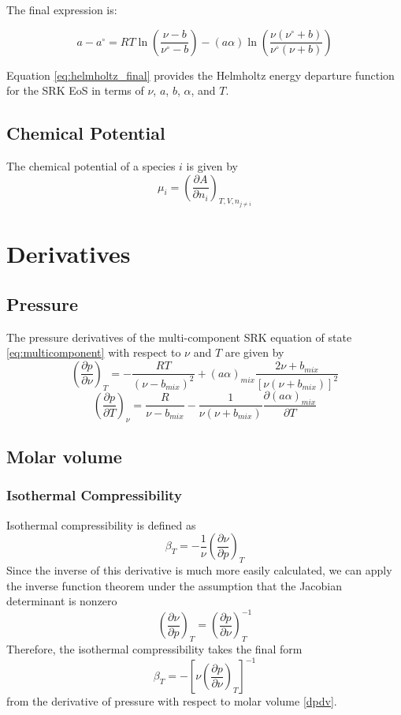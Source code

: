 \documentclass{article}
\newcommand{\pderiv}[2]{\frac{\partial #1}{\partial #2}}
\newcommand{\pderivconst}[3]{\left(\pderiv{#1}{#2}\right)_{#3}}
\begin{document}
The final expression is:

\begin{equation}
a - a^\circ = RT \ln\left(\frac{\nu - b}{\nu^\circ - b}\right) - (a\alpha) \ln\left(\frac{\nu(\nu^\circ + b)}{\nu^\circ(\nu + b)}\right) \label{eq:helmholtz_final}
\end{equation}

Equation \eqref{eq:helmholtz_final} provides the Helmholtz energy departure function for the SRK EoS in terms of \( \nu \), \( a \), \( b \), \( \alpha \), and \( T \).

\subsection{Chemical Potential}
The chemical potential of a species $i$ is given by
\begin{equation}
    \mu_i = \pderivconst{A}{n_i}{T,V,n_{j\neq i}}
\end{equation}

\section{Derivatives}
\subsection{Pressure}
The pressure derivatives of the multi-component SRK equation of state \eqref{eq:multicomponent} with respect to $\nu$ and $T$ are given by
\begin{equation}
    \pderivconst{p}{\nu}{T} = -\frac{RT}{(\nu-b_{mix})^2} + (a\alpha)_{mix}\frac{2\nu+b_{mix}}{[\nu(\nu+b_{mix})]^2} \label{dpdv}
\end{equation}
\begin{equation}
    \pderivconst{p}{T}{\nu} = \frac{R}{\nu-b_{mix}} - \frac{1}{\nu(\nu+b_{mix})}\frac{\partial (a\alpha)_{mix}}{\partial T} \label{dpdT}
\end{equation}


\subsection{Molar volume}
\subsubsection{Isothermal Compressibility}
Isothermal compressibility is defined as 
\begin{equation}
    \beta_T = -\frac{1}{\nu} \pderivconst{\nu}{p}{T}
\end{equation}
Since the inverse of this derivative is much more easily calculated, we can apply the inverse function theorem under the assumption that the Jacobian determinant is nonzero
\begin{equation*}
    \pderivconst{\nu}{p}{T} = \pderivconst{p}{\nu}{T}^{-1}
\end{equation*}
Therefore, the isothermal compressibility takes the final form
\begin{equation}
    \beta_T = -\left[\nu \pderivconst{p}{\nu}{T}\right]^{-1} \label{betaT}
\end{equation}
from the derivative of pressure with respect to molar volume \eqref{dpdv}.
\end{document}
